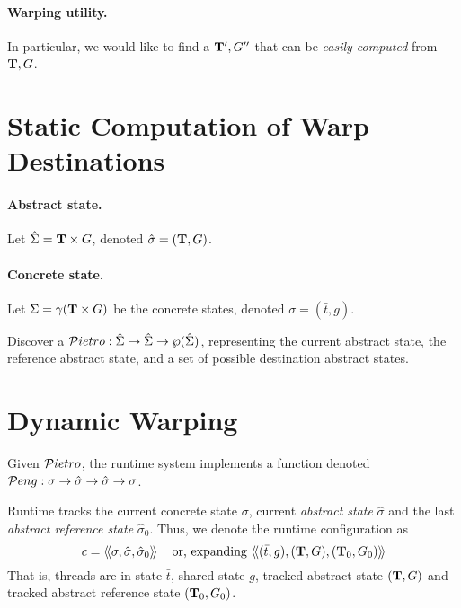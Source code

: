 \paragraph{Warping utility.}
In particular, we would like to find a $\mathbf{T}',G''$ that can be 
\emph{easily computed} from $\mathbf{T},G$.



\section{Static Computation of Warp Destinations}

\paragraph{Abstract state.}
Let $\hat{\Sigma} = \mathbf{T} \times G$, denoted $\hat{\sigma} = (\mathbf{T},G)$.

\newcommand\ts{\bar{t}}

\paragraph{Concrete state.}
Let $\Sigma = \gamma(\mathbf{T} \times G)$ be the concrete states, denoted $\sigma = (\ts,g)$.

\newcommand\Pietrot{{\cal P}ietro}

Discover a $\Pietrot : \hat{\Sigma} \rightarrow \hat{\Sigma}
\rightarrow \wp({\hat{\Sigma}})$, representing the current abstract
state, the reference abstract state, and a set of possible destination
abstract states.


\newcommand\llangle{\langle\!\langle}
\newcommand\rrangle{\rangle\!\rangle}

\section{Dynamic Warping}

\newcommand\Pengt{{\cal P}eng}
Given $\Pietrot$, the runtime system implements a function
denoted $\Pengt : \sigma \rightarrow \hat{\sigma} \rightarrow \hat{\sigma} \rightarrow \sigma$. 


Runtime tracks the current concrete state $\sigma$,
current \emph{abstract state} $\hat{\sigma}$ and the last
\emph{abstract reference state} $\hat{\sigma}_0$. Thus, we denote the runtime
configuration as
$$
    c =  \llangle \sigma,\hat{\sigma},\hat{\sigma}_0 \rrangle 
\;\;\;\text{ or, expanding }
    \llangle (\ts,g),(\Ts,G),(\Ts_0,G_0) \rrangle 
$$
That is, threads are in state $\ts$, shared state $g$, tracked abstract state
$(\mathbf{T},G)$ and tracked abstract reference state $(\mathbf{T}_0,G_0)$.

